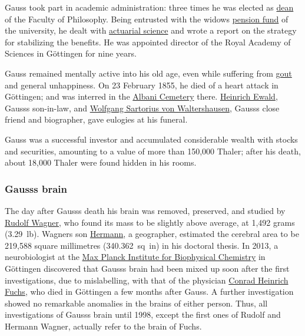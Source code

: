 Gauss took part in academic administration: three times he was elected as \href{https://en.wikipedia.org/wiki/Dean_(education)}{dean} of the Faculty of Philosophy. Being entrusted with the widow\textquotesingle s \href{https://en.wikipedia.org/wiki/Pension_fund}{pension fund} of the university, he dealt with \href{https://en.wikipedia.org/wiki/Actuarial_science}{actuarial science} and wrote a report on the strategy for stabilizing the benefits. He was appointed director of the Royal Academy of Sciences in Göttingen for nine years.

Gauss remained mentally active into his old age, even while suffering from \href{https://en.wikipedia.org/wiki/Gout}{gout} and general unhappiness. On 23 February 1855, he died of a heart attack in Göttingen; and was interred in the \href{https://en.wikipedia.org/wiki/Albanifriedhof}{Albani Cemetery} there. \href{https://en.wikipedia.org/wiki/Heinrich_Ewald}{Heinrich Ewald}, Gauss\textquotesingle s son-in-law, and \href{https://en.wikipedia.org/wiki/Wolfgang_Sartorius_von_Waltershausen}{Wolfgang Sartorius von Waltershausen}, Gauss\textquotesingle s close friend and biographer, gave eulogies at his funeral.

Gauss was a successful investor and accumulated considerable wealth with stocks and securities, amounting to a value of more than 150,000 Thaler; after his death, about 18,000 Thaler were found hidden in his rooms.


\subsubsection[Gauss\textquotesingle s brain]{\texorpdfstring{\protect\hypertarget{Gauss.27s_brain}{}{}Gauss\textquotesingle s brain}{Gauss\textquotesingle s brain}}\label{Gaussux27s_brain}

The day after Gauss\textquotesingle s death his brain was removed, preserved, and studied by \href{https://en.wikipedia.org/wiki/Rudolf_Wagner}{Rudolf Wagner}, who found its mass to be slightly above average, at {1,492 grams (3.29}{~}{lb)}. Wagner\textquotesingle s son \href{https://en.wikipedia.org/wiki/Hermann_Wagner_(geographer)}{Hermann}, a geographer, estimated the cerebral area to be {219,588 square millimetres (340.362}{~}{sq}{~}{in)} in his doctoral thesis. In 2013, a neurobiologist at the \href{https://en.wikipedia.org/wiki/Max_Planck_Institute_for_Biophysical_Chemistry}{Max Planck Institute for Biophysical Chemistry} in Göttingen discovered that Gauss\textquotesingle s brain had been mixed up soon after the first investigations, due to mislabelling, with that of the physician \href{https://en.wikipedia.org/wiki/Conrad_Heinrich_Fuchs}{Conrad Heinrich Fuchs}, who died in Göttingen a few months after Gauss. A further investigation showed no remarkable anomalies in the brains of either person. Thus, all investigations of Gauss\textquotesingle s brain until 1998, except the first ones of Rudolf and Hermann Wagner, actually refer to the brain of Fuchs.


